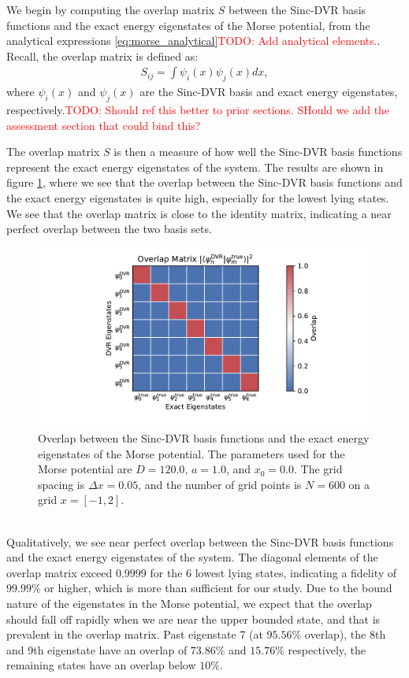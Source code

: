 \documentclass{subfiles}
\begin{document}
We begin by computing the overlap matrix $S$ between the Sinc-DVR basis functions and the exact energy eigenstates of the Morse potential, from the analytical expressions \ref{eq:morse_analytical}\textcolor{red}{TODO: Add analytical elements.}. Recall, the overlap matrix is defined as:
\begin{align*}
    S_{ij} = \int \psi_i(x) \psi_j(x) dx,
\end{align*}
where $\psi_i(x)$ and $\psi_j(x)$ are the Sinc-DVR basis and exact energy eigenstates, respectively.\textcolor{red}{TODO: Should ref this better to prior sections. SHould we add the assessment section that could bind this?} 

The overlap matrix $S$ is then a measure of how well the Sinc-DVR basis functions represent the exact energy eigenstates of the system. The results are shown in figure \ref{fig:dvr_validation_overlap}, where we see that the overlap between the Sinc-DVR basis functions and the exact energy eigenstates is quite high, especially for the lowest lying states. We see that the overlap matrix is close to the identity matrix, indicating a near perfect overlap between the two basis sets.
\begin{figure}[h!]
    \centering
    \includegraphics[width=\textwidth]{figs/dvr_validation_overlap.pdf}
    \caption{Overlap between the Sinc-DVR basis functions and the exact energy eigenstates of the Morse potential. The parameters used for the Morse potential are $D = 120.0$, $a = 1.0$, and $x_0 = 0.0$. The grid spacing is $\Delta x = 0.05$, and the number of grid points is $N = 600$ on a grid $x=[-1, 2]$.}
    \label{fig:dvr_validation_overlap}
\end{figure}
\\
Qualitatively, we see near perfect overlap between the Sinc-DVR basis functions and the exact energy eigenstates of the system. The diagonal elements of the overlap matrix exceed $0.9999$ for the 6 lowest lying states, indicating a fidelity of $99.99\%$ or higher, which is more than sufficient for our study. Due to the bound nature of the eigenstates in the Morse potential, we expect that the overlap should fall off rapidly when we are near the upper bounded state, and that is prevalent in the overlap matrix. Past eigenstate 7 (at $95.56\%$ overlap), the 8th and 9th eigenstate have an overlap of $73.86\%$ and $15.76\%$ respectively, the remaining states have an overlap below $10\%$. 
\end{document}
